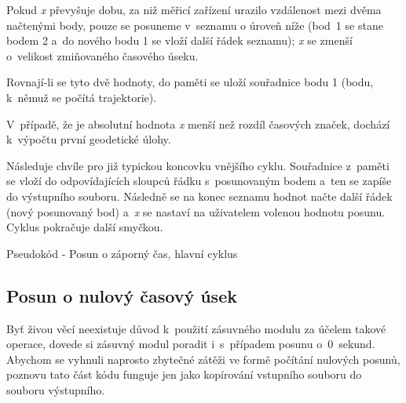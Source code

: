 Pokud \textit{x} převyšuje dobu, za niž měřicí zařízení urazilo vzdálenost mezi dvěma načtenými
body, pouze se posuneme v~seznamu o úroveň níže (bod~1 se stane bodem 2 a~do nového
bodu 1 se vloží další řádek seznamu); \textit{x} se zmenší o~velikost zmiňovaného časového úseku. 

Rovnají-li se tyto dvě hodnoty, do paměti se uloží
souřadnice bodu 1 (bodu, k~němuž se počítá trajektorie). 

V~případě, že je absolutní hodnota \textit{x} menší než rozdíl časových značek, dochází
k~výpočtu první geodetické úlohy. 

Následuje chvíle pro již typickou koncovku vnějšího cyklu. Souřadnice z~paměti se vloží
do odpovídajících sloupců řádku s~posunovaným bodem a~ten se zapíše do výstupního souboru.
Následně se na konec seznamu hodnot načte další řádek (nový posunovaný bod) a~\textit{x}
se nastaví na uživatelem volenou hodnotu posunu. Cyklus pokračuje další smyčkou. 

\begin{algorithm}
    \caption{Pseudokód - Posun o záporný čas, hlavní cyklus}
    \label{fig:pseudozapornycas-hlavnicyklus}
    \begin{algorithmic}[1]
    \ENDIF
    \ENDFOR
    \ENDWHILE
    \end{algorithmic}
\end{algorithm}

\subsection{Posun o nulový časový úsek}
\label{nulovycas}

Byť živou věcí neexistuje důvod k~použití zásuvného modulu za účelem takové ope\-race,
dovede si zásuvný modul poradit i~s~případem posunu o~0~sekund. Abychom se vyhnuli
naprosto zbytečné zátěži ve formě počítání nulových posunů, poznovu tato část kódu
funguje jen jako kopírování vstupního souboru do souboru výstupního. 

